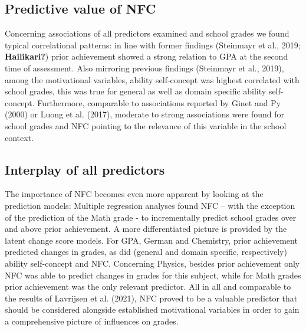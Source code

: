 \documentclass[
  man]{apa6}
\begin{document}
\hypertarget{predictive-value-of-nfc}{%
\subsection{Predictive value of NFC}\label{predictive-value-of-nfc}}

Concerning associations of all predictors examined and school grades we found typical correlational patterns: in line with former findings (Steinmayr et al., 2019; \textbf{Hailikari?}) prior achievement showed a strong relation to GPA at the second time of assessment. Also mirroring previous findings (Steinmayr et al., 2019), among the motivational variables, ability self-concept was highest correlated with school grades, this was true for general as well as domain specific ability self-concept. Furthermore, comparable to associations reported by Ginet and Py (2000) or Luong et al. (2017), moderate to strong associations were found for school grades and NFC pointing to the relevance of this variable in the school context.

\hypertarget{interplay-of-all-predictors}{%
\subsection{Interplay of all predictors}\label{interplay-of-all-predictors}}

The importance of NFC becomes even more apparent by looking at the prediction models: Multiple regression analyses found NFC -- with the exception of the prediction of the Math grade - to incrementally predict school grades over and above prior achievement. A more differentiated picture is provided by the latent change score models. For GPA, German and Chemistry, prior achievement predicted changes in grades, as did (general and domain specific, respectively) ability self-concept and NFC. Concerning Physics, besides prior achievement only NFC was able to predict changes in grades for this subject, while for Math grades prior achievement was the only relevant predictor. All in all and comparable to the results of Lavrijsen et al. (2021), NFC proved to be a valuable predictor that should be considered alongside established motivational variables in order to gain a comprehensive picture of influences on grades.
\end{document}

